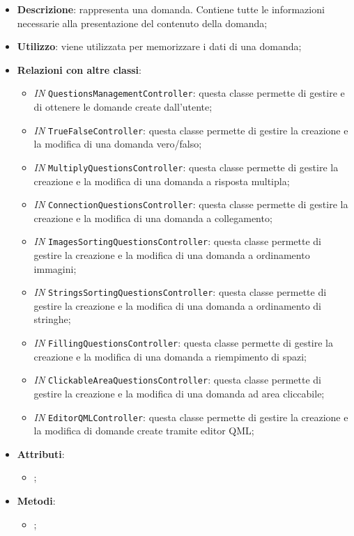 		\begin{itemize}
			\item \textbf{Descrizione}: rappresenta una domanda. Contiene tutte le informazioni necessarie alla
			presentazione del contenuto della domanda;
			\item \textbf{Utilizzo}: viene utilizzata per memorizzare i dati di una domanda;
			\item \textbf{Relazioni con altre classi}: 
			\begin{itemize}
				\item \textit{IN} \texttt{QuestionsManagementController}: questa classe permette di gestire e di ottenere le domande create dall'utente;
				\item \textit{IN} \texttt{TrueFalseController}: questa classe permette di gestire la creazione e la modifica di una domanda vero/falso;
				\item \textit{IN} \texttt{MultiplyQuestionsController}: questa classe permette di gestire la creazione e la modifica di una domanda a risposta multipla; 
				\item \textit{IN} \texttt{ConnectionQuestionsController}: questa classe permette di gestire la creazione e la modifica di una domanda a collegamento;
				\item \textit{IN} \texttt{ImagesSortingQuestionsController}: questa classe permette di gestire la creazione e la modifica di una domanda a ordinamento immagini;
				\item \textit{IN} \texttt{StringsSortingQuestionsController}: questa classe permette di gestire la creazione e la modifica di una domanda a ordinamento di stringhe;
				\item \textit{IN} \texttt{FillingQuestionsController}: questa classe permette di gestire la creazione e la modifica di una domanda a riempimento di spazi; 
				\item \textit{IN} \texttt{ClickableAreaQuestionsController}: questa classe permette di gestire la creazione e la modifica di una domanda ad area cliccabile;
				\item \textit{IN} \texttt{EditorQMLController}: questa classe permette di gestire la creazione e la modifica di domande create tramite editor QML;
			\end{itemize}
			\item \textbf{Attributi}: 
			\begin{itemize}
				\item ;
			\end{itemize}
			\item \textbf{Metodi}: 
			\begin{itemize}
				\item ;
			\end{itemize}
		\end{itemize}
		
